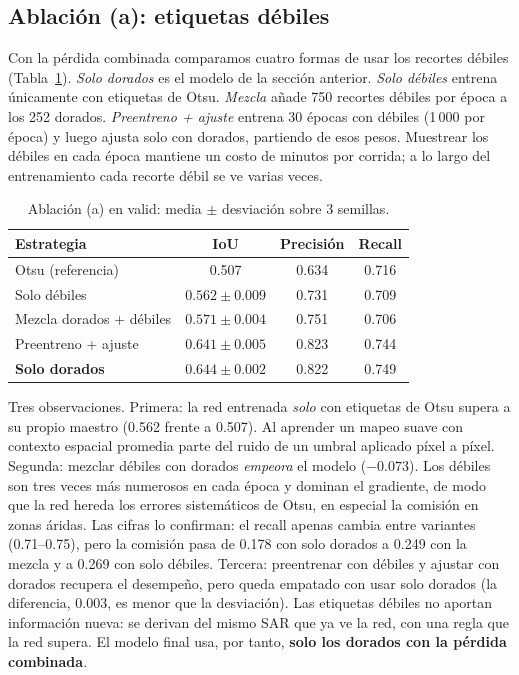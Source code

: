 
\subsection{Ablación (a): etiquetas débiles}
\label{sec:ablacion_debiles}

Con la pérdida combinada comparamos cuatro formas de usar los recortes débiles
(Tabla~\ref{tab:ablacion_a}). \emph{Solo dorados} es el modelo de la sección anterior.
\emph{Solo débiles} entrena únicamente con etiquetas de Otsu. \emph{Mezcla} añade 750 recortes
débiles por época a los 252 dorados. \emph{Preentreno + ajuste} entrena 30 épocas con débiles
(1\,000 por época) y luego ajusta solo con dorados, partiendo de esos pesos. Muestrear los débiles
en cada época mantiene un costo de minutos por corrida; a lo largo del entrenamiento cada
recorte débil se ve varias veces.

\begin{table}[t]
\centering
\caption{Ablación (a) en valid: media $\pm$ desviación sobre 3 semillas.}
\label{tab:ablacion_a}
\begin{tabular}{lccc}
\toprule
Estrategia & IoU & Precisión & Recall \\
\midrule
Otsu (referencia)        & 0.507                    & 0.634  & 0.716 \\
Solo débiles             & $0.562\pm0.009$          & 0.731 & 0.709 \\
Mezcla dorados + débiles & $0.571\pm0.004$          & 0.751 & 0.706 \\
Preentreno + ajuste      & $0.641\pm0.005$          & 0.823 & 0.744 \\
\textbf{Solo dorados}    & $\mathbf{0.644\pm0.002}$ & 0.822 & 0.749 \\
\bottomrule
\end{tabular}
\end{table}

Tres observaciones. Primera: la red entrenada \emph{solo} con etiquetas de Otsu supera a su
propio maestro (0.562 frente a 0.507). Al aprender un mapeo suave con contexto espacial
promedia parte del ruido de un umbral aplicado píxel a píxel. Segunda: mezclar débiles con
dorados \emph{empeora} el modelo ($-0.073$). Los débiles son tres veces más numerosos en cada
época y dominan el gradiente, de modo que la red hereda los errores sistemáticos de Otsu, en
especial la comisión en zonas áridas. Las cifras lo confirman: el recall apenas cambia entre
variantes (0.71--0.75), pero la comisión pasa de 0.178 con solo dorados a 0.249 con la mezcla y
a 0.269 con solo débiles. Tercera: preentrenar con débiles y ajustar con dorados
recupera el desempeño, pero queda empatado con usar solo dorados (la diferencia, $0.003$, es
menor que la desviación). Las etiquetas débiles no aportan información nueva: se derivan del
mismo SAR que ya ve la red, con una regla que la red supera. El modelo final usa, por tanto,
\textbf{solo los dorados con la pérdida combinada}.
